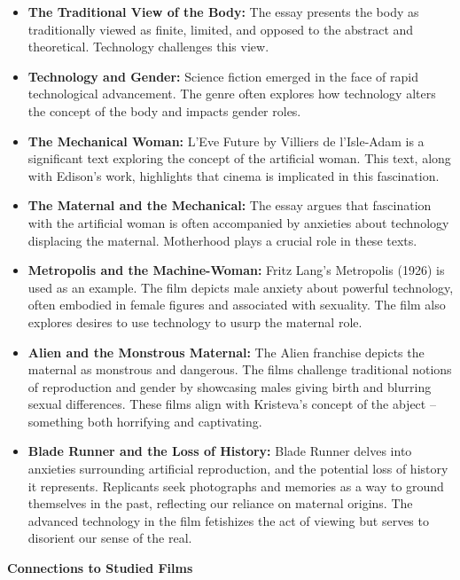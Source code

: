 \documentclass[11pt,fleqn]{book}
\begin{document}
\begin{itemize}
\item \textbf{The Traditional View of the Body:}  The essay presents the body as traditionally viewed as finite, limited, and opposed to the abstract and theoretical. Technology challenges this view. 
\item \textbf{Technology and Gender:} Science fiction emerged in the face of rapid technological advancement. The genre often explores how technology alters the concept of the body and impacts gender roles.
\item \textbf{The Mechanical Woman:}  L'Eve Future by Villiers de l’Isle-Adam is a significant text exploring the concept of the artificial woman.  This text, along with Edison's work, highlights that cinema is implicated in this fascination.
\item  \textbf{The Maternal and the Mechanical:} The essay argues that fascination with the artificial woman is often accompanied by anxieties about technology displacing the maternal. Motherhood plays a crucial role in these texts. 
\item \textbf{Metropolis and the Machine-Woman:} Fritz Lang's Metropolis (1926) is used as an example. The film depicts male anxiety about powerful technology, often embodied in female figures and associated with sexuality. The film also explores desires to use technology to usurp the maternal role.
\item \textbf{Alien and the Monstrous Maternal:} The Alien franchise depicts the maternal as monstrous and dangerous. The films challenge traditional notions of reproduction and gender by showcasing males giving birth and blurring sexual differences. These films align with Kristeva's concept of the abject – something both horrifying and captivating. 
\item \textbf{Blade Runner and the Loss of History:}  Blade Runner delves into anxieties surrounding artificial reproduction, and the potential loss of history it represents. Replicants seek photographs and memories as a way to ground themselves in the past, reflecting our reliance on maternal origins. The advanced technology in the film fetishizes the act of viewing but serves to disorient our sense of the real.
\end{itemize} 
\vspace{5pt} 

\textbf{Connections to Studied Films}
\end{document}
